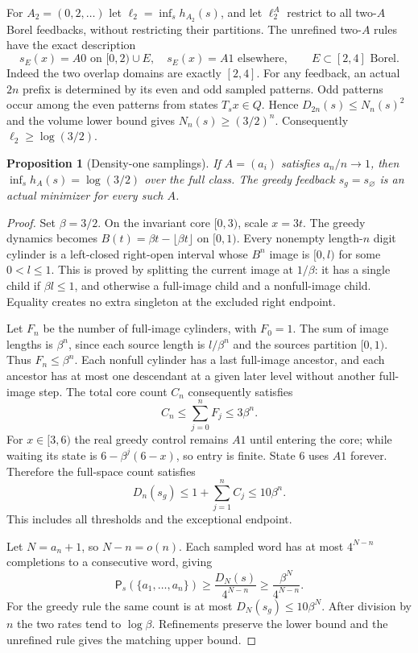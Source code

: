 \documentclass[11pt,reqno]{amsart}
\numberwithin{equation}{section}
\newtheorem{proposition}[theorem]{Proposition}
\theoremstyle{definition}
\newcommand{\Patt}{\mathsf P}
\begin{document}
For $A_2=(0,2,\ldots)$ let
$\ell_2=\inf_s h_{A_2}(s)$, and let $\ell_2^A$ restrict to
all two-$A$ Borel feedbacks, without restricting their partitions.
The unrefined two-$A$ rules have the exact description
\[
 s_E(x)=A0\text{ on }[0,2)\cup E,
 \quad s_E(x)=A1\text{ elsewhere},\qquad E\subset[2,4]
 \text{ Borel}.
\]
Indeed the two overlap domains are exactly $[2,4]$.
For any feedback, an actual $2n$ prefix is determined by its even
and odd sampled patterns. Odd patterns occur among the even
patterns from states $T_sx\in Q$. Hence
$D_{2n}(s)\le N_n(s)^2$ and the volume lower bound gives
$N_n(s)\ge(3/2)^n$. Consequently $\ell_2\ge\log(3/2)$.

\begin{proposition}[Density-one samplings]\label{prop:density-one}
If $A=(a_i)$ satisfies $a_n/n\to1$, then
$\inf_s h_A(s)=\log(3/2)$ over the full class.
The greedy feedback $s_g=s_\varnothing$ is an actual minimizer
for every such $A$.
\end{proposition}
\begin{proof}
Set $\beta=3/2$. On the invariant core $[0,3)$, scale $x=3t$.
The greedy dynamics becomes $B(t)=\beta t-\lfloor\beta t\rfloor$
on $[0,1)$. Every nonempty length-$n$ digit cylinder is a
left-closed right-open interval whose $B^n$ image is $[0,l)$
for some $0<l\le1$. This is proved by splitting the current
image at $1/\beta$: it has a single child if $\beta l\le1$,
and otherwise a full-image child and a nonfull-image child.
Equality creates no extra singleton at the excluded right endpoint.

Let $F_n$ be the number of full-image cylinders, with $F_0=1$.
The sum of image lengths is $\beta^n$, since each source length
is $l/\beta^n$ and the sources partition $[0,1)$. Thus
$F_n\le\beta^n$. Each nonfull cylinder has a last full-image
ancestor, and each ancestor has at most one descendant at a given
later level without another full-image step. The total core count
$C_n$ consequently satisfies
\[
 C_n\le\sum_{j=0}^n F_j\le3\beta^n.
\]
For $x\in[3,6)$ the real greedy control remains $A1$ until
entering the core; while waiting its state is
$6-\beta^j(6-x)$, so entry is finite. State $6$ uses $A1$
forever. Therefore the full-space count satisfies
\[
 D_n(s_g)\le1+\sum_{j=1}^n C_j\le10\beta^n.
\]
This includes all thresholds and the exceptional endpoint.

Let $N=a_n+1$, so $N-n=o(n)$. Each sampled word has at most
$4^{N-n}$ completions to a consecutive word, giving
\[
 \Patt_s(\{a_1,\ldots,a_n\})\ge
 \frac{D_N(s)}{4^{N-n}}\ge\frac{\beta^N}{4^{N-n}}.
\]
For the greedy rule the same count is at most
$D_N(s_g)\le10\beta^N$. After division by $n$ the two
rates tend to $\log\beta$. Refinements preserve the lower
bound and the unrefined rule gives the matching upper bound.
\end{proof}
\end{document}

